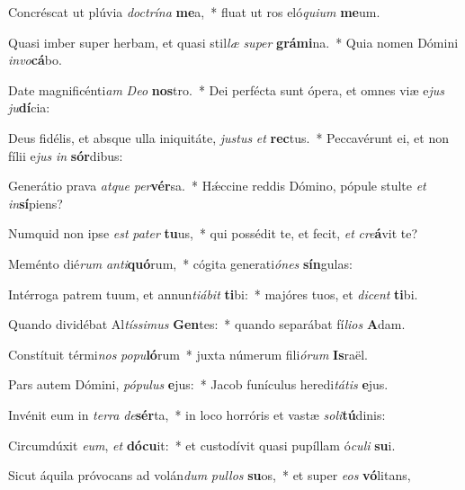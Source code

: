 \item Concréscat ut plúvia \textit{doc}\textit{trí}\textit{na} \textbf{me}a,~* fluat ut ros eló\textit{qui}\textit{um} \textbf{me}um.
\item Quasi imber super herbam, et quasi stil\textit{læ} \textit{su}\textit{per} \textbf{grá}\textbf{mi}na.~* Quia nomen Dómini \textit{in}\textit{vo}\textbf{cá}bo.
\item Date magnificénti\textit{am} \textit{De}\textit{o} \textbf{nos}tro.~* Dei perfécta sunt ópera, et omnes viæ e\textit{jus} \textit{ju}\textbf{dí}cia:
\item Deus fidélis, et absque ulla iniquitáte, \textit{jus}\textit{tus} \textit{et} \textbf{rec}tus.~* Peccavérunt ei, et non fílii e\textit{jus} \textit{in} \textbf{sór}dibus:
\item Generátio prava \textit{at}\textit{que} \textit{per}\textbf{vér}sa.~* Hǽccine reddis Dómino, pópule stulte \textit{et} \textit{in}\textbf{sí}piens?
\item Numquid non ipse \textit{est} \textit{pa}\textit{ter} \textbf{tu}us,~* qui possédit te, et fecit, \textit{et} \textit{cre}\textbf{á}vit te?
\item Meménto dié\textit{rum} \textit{an}\textit{ti}\textbf{quó}rum,~* cógita generati\textit{ó}\textit{nes} \textbf{sín}gulas:
\item Intérroga patrem tuum, et annun\textit{ti}\textit{á}\textit{bit} \textbf{ti}bi:~* majóres tuos, et \textit{di}\textit{cent} \textbf{ti}bi.
\item Quando dividébat Al\textit{tís}\textit{si}\textit{mus} \textbf{Gen}tes:~* quando separábat fí\textit{li}\textit{os} \textbf{A}dam.
\item Constítuit térmi\textit{nos} \textit{po}\textit{pu}\textbf{ló}rum~* juxta númerum fili\textit{ó}\textit{rum} \textbf{Is}raël.
\item Pars autem Dómini, \textit{pó}\textit{pu}\textit{lus} \textbf{e}jus:~* Jacob funículus heredi\textit{tá}\textit{tis} \textbf{e}jus.
\item Invénit eum in \textit{ter}\textit{ra} \textit{de}\textbf{sér}ta,~* in loco horróris et vastæ \textit{so}\textit{li}\textbf{tú}dinis:
\item Circumdúxit \textit{e}\textit{um}, \textit{et} \textbf{dó}\textbf{cu}it:~* et custodívit quasi pupíllam ó\textit{cu}\textit{li} \textbf{su}i.
\item Sicut áquila próvocans ad volán\textit{dum} \textit{pul}\textit{los} \textbf{su}os,~* et super \textit{e}\textit{os} \textbf{vó}litans,
